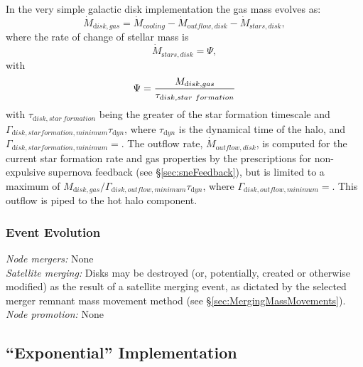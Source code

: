 In the very simple galactic disk implementation the gas mass evolves as:
\begin{equation}
 \dot{M}_{\mathrm disk, gas} = \dot{M}_{\mathrm cooling} - \dot{M}_{\mathrm outflow, disk} - \dot{M}_{\mathrm stars, disk},
\end{equation}
where the rate of change of stellar mass is
\begin{equation}
 \dot{M}_{\mathrm stars, disk} = \Psi,
\end{equation}
with
\begin{equation}
 \Psi = {M_{\mathrm disk, gas} \over \tau_{\mathrm disk, star~formation}}
\end{equation}
with $\tau_{\mathrm disk, star~formation}$ being the greater of the star formation timescale and $\Gamma_{\mathrm disk, star formation, minimum} \tau_{\mathrm dyn}$, where $\tau_{\mathrm dyn}$ is the dynamical time of the halo, and $\Gamma_{\mathrm disk, star formation, minimum}=${\normalfont \ttfamily [diskStarFormationTimescaleMinimum]}. The outflow rate, $\dot{M}_{\mathrm outflow, disk}$, is computed for the current star formation rate and gas properties by the prescriptions for non-expulsive supernova feedback (see \S\ref{sec:sneFeedback}), but is limited to a maximum of $M_{\mathrm disk, gas}/ \Gamma_{\mathrm disk, outflow, minimum} \tau_{\mathrm dyn}$, where $\Gamma_{\mathrm disk, outflow, minimum}=${\normalfont \ttfamily [diskOutflowTimescaleMinimum]}. This outflow is piped to the hot halo component.

\subsubsection{Event Evolution}

\noindent\emph{Node mergers:} None\\

\noindent\emph{Satellite merging:} Disks may be destroyed (or, potentially, created or otherwise modified) as the result of a satellite merging event, as dictated by the selected merger remnant mass movement method (see \S\ref{sec:MergingMassMovements}).\\

\noindent\emph{Node promotion:} None\\

\subsection{``Exponential'' Implementation}\label{sec:DiskExponential}


